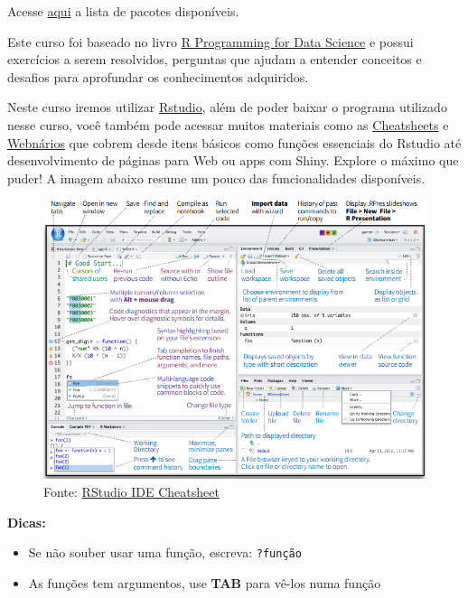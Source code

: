 \documentclass[]{book}
\providecommand{\tightlist}{%
  \setlength{\itemsep}{0pt}\setlength{\parskip}{0pt}}
\theoremstyle{definition}
\theoremstyle{definition}
\theoremstyle{definition}
\theoremstyle{remark}
\begin{document}
Acesse
\href{https://cran.r-project.org/web/packages/available_packages_by_name.html}{aqui}
a lista de pacotes disponíveis.

Este curso foi baseado no livro
\href{https://leanpub.com/rprogramming}{R Programming for Data Science}
e possui {exercícios} a serem resolvidos, {perguntas} que ajudam a
entender conceitos e {desafios} para aprofundar os conhecimentos
adquiridos.

Neste curso iremos utilizar \href{https://www.rstudio.com/}{Rstudio},
além de poder baixar o programa utilizado nesse curso, você também pode
acessar muitos materiais como as
\href{https://www.rstudio.com/resources/cheatsheets/}{Cheatsheets} e
\href{https://www.rstudio.com/resources/webinars/}{Webnários} que cobrem
desde itens básicos como funções essenciais do Rstudio até
desenvolvimento de páginas para Web ou apps com Shiny. Explore o máximo
que puder! A imagem abaixo resume um pouco das funcionalidades
disponíveis.

\begin{figure}
\centering
\includegraphics{figuras/rstudio_ide.png}
\caption{Fonte:
\href{https://github.com/rstudio/cheatsheets/raw/master/rstudio-ide.pdf}{RStudio
IDE Cheatsheet}}
\end{figure}

\textbf{Dicas:}

\begin{itemize}
\tightlist
\item
  Se não souber usar uma função, escreva: \texttt{?função}
\item
  As funções tem argumentos, use \textbf{TAB} para vê-los numa função
\end{itemize}
\end{document}

